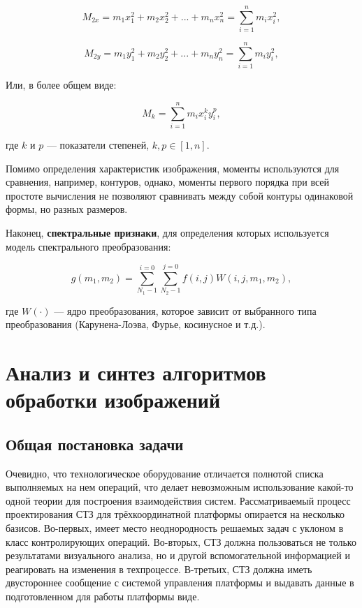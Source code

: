 \begin{equation}
M_{2x} = m_1 x_1^2 + m_2 x_2^2 + ... + m_n x_n^2 = \sum_{i=1}^{n} m_i x_i^2,
\label{eq_3_9}
\end{equation}

\begin{equation}
M_{2y} = m_1 y_1^2 + m_2 y_2^2 + ... + m_n y_n^2 = \sum_{i=1}^{n} m_i y_i^2,
\label{eq_3_10}
\end{equation}

Или, в более общем виде:

\begin{equation}
M_k = \sum_{i=1}^{n} m_i x_i^k y_i^p,
\label{eq_3_11}
\end{equation}

где $k$ и $p$ --- показатели степеней, $k,p\in[1, n]$.

Помимо определения характеристик изображения, моменты используются для сравнения, например, контуров, однако, моменты первого порядка при всей простоте вычисления не позволяют сравнивать между собой контуры одинаковой формы, но разных размеров.

Наконец, \textbf{спектральные признаки}, для определения которых используется модель спектрального преобразования:

\begin{equation}
g(m_1, m_2) = \sum_{N_1 - 1}^{i = 0} \sum_{N_2 - 1}^{j = 0} f(i, j) W(i, j, m_1, m_2),
\label{eq_3_12}
\end{equation}

где $W(\cdot)$ --- ядро преобразования, которое зависит от выбранного типа преобразования (Карунена-Лоэва, Фурье, косинусное и т.д.).

\section{Анализ и синтез алгоритмов обработки изображений} \label{sect3_3}

\subsection{Общая постановка задачи} \label{ssect3_3_1}

Очевидно, что технологическое оборудование отличается полнотой списка выполняемых на нем операций, что делает невозможным использование какой-то одной теории для построения взаимодействия систем. Рассматриваемый процесс проектирования СТЗ для трёхкоординатной платформы опирается на несколько базисов. Во-первых, имеет место неоднородность решаемых задач с уклоном в класс контролирующих операций. Во-вторых, СТЗ должна пользоваться не только результатами визуального анализа, но и другой вспомогательной информацией и реагировать на изменения в техпроцессе. В-третьих, СТЗ должна иметь двустороннее сообщение с системой управления платформы и выдавать данные в подготовленном для работы платформы виде.

